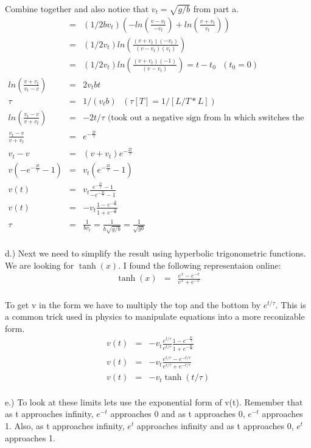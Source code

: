 \documentclass[11pt]{amsart}
\begin{document}
Combine together and also notice that $v_{t} = \sqrt{g/b}$ from part a. \\ 
\begin{eqnarray*} 
&=& (1/2bv_{t})(-ln(\frac{v-v_{t}}{-v_{t}}) +ln(\frac{v+v_{t}}{v_{t}})) \\
&=& (1/2v_{t})ln(\frac{(v+v_{t})(-v_{t})}{(v-v_{t})(v_{t})}) \\
&=& (1/2v_{t})ln(\frac{(v+v_{t})(-1)}{(v-v_{t})}) = t-t_{0} \mbox{ } (t_{0} = 0) \\
ln(\frac{v+v_{t}}{v_{t}-v}) &=& 2v_{t}bt \\ 
\tau &=& 1/(v_{t}b) \mbox{ } (\tau [T] = 1/[L/T*L]) \\
ln(\frac{v_{t}-v}{v+v_{t}}) &=& -2t/\tau \mbox{ (took out a negative sign from ln which switches the fraction)} \\
\frac{v_{t}-v}{v+v_{t}} &=& e^{-\frac{2t}{\tau}} \\
v_{t} - v &=& (v + v_{t})e^{-\frac{2t}{\tau}} \\
v(-e^{-\frac{2t}{\tau}}-1) &=& v_{t}(e^{-\frac{2t}{\tau}}-1) \\
v(t) &=& v_{t}\frac{e^{-\frac{2t}{\tau}}-1}{-e^{-\frac{2t}{\tau}}-1} \\
v(t) &=& -v_{t}\frac{1-e^{-\frac{2t}{\tau}}}{1+e^{-\frac{2t}{\tau}}} \\
\tau &=& \frac{1}{bv_{t}} = \frac{1}{b\sqrt{g/b}} = \frac{1}{\sqrt{gb}} 
\end{eqnarray*}  \\
d.) Next we need to simplify the result using hyperbolic trigonometric functions. We are looking for $\tanh(x)$. I found the following representaion online: \\ 
\begin{eqnarray*}
\tanh(x) &=& \frac{e^{x}-e^{-x}}{e^{x}+e^{-x}} 
\end{eqnarray*} \\
To get v in the form we have to multiply the top and the bottom by $e^{t/\tau}$. This is a common trick used in physics to manipulate equations into a more reconizable form. \\
\begin{eqnarray*}
v(t) &=& -v_{t}\frac{e^{t/\tau}}{e^{t/\tau}}\frac{1-e^{-\frac{2t}{\tau}}}{1+e^{-\frac{2t}{\tau}}} \\
v(t) &=& -v_{t}\frac{e^{t/\tau}-e^{-t/\tau}}{e^{t/\tau}+e^{-t/\tau}} \\
v(t) &=& -v_{t}\tanh(t/\tau) 
\end{eqnarray*} \\
e.) To look at these limits lets use the exponential form of v(t). Remember that as t approaches infinity, $e^{-t}$ approaches 0 and as t approaches 0, $e^{-t}$ approaches 1. Also, as t approaches infinity, $e^{t}$ approaches infinity and as t approaches 0, $e^{t}$ approaches 1. \\ 
\end{document}
